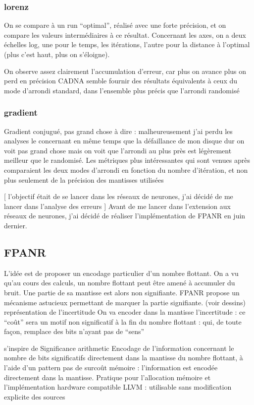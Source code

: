 \documentclass[a4paper,11pt]{article}
\begin{document}
\subsubsection{lorenz}
On se compare à un run “optimal”, réalisé avec une forte précision, et on compare les valeurs intermédiaires à ce résultat.
Concernant les axes, on a deux échelles log, une pour le temps, les itérations, l’autre pour la distance à l’optimal (plus c’est haut, plus on s’éloigne).

On observe assez clairement l’accumulation d’erreur, car plus on avance plus on perd en précision 
CADNA semble fournir des résultats équivalents à ceux du mode d’arrondi standard, dans l’ensemble plus précis que l’arrondi randomisé

\subsubsection{gradient}
Gradient conjugué, pas grand chose à dire : malheureusement j’ai perdu les analyses le concernant en même temps que la défaillance de mon disque dur
on voit pas grand chose mais on voit que l’arrondi au plus près est légèrement meilleur que le randomisé.
Les métriques plus intéressantes qui sont venues après comparaient les deux modes d’arrondi en fonction du nombre d’itération, et non plus seulement de la précision des mantisses utilisées

[ l’objectif était de se lancer dans les réseaux de neurones, j’ai décidé de me lancer dans l’analyse des erreurs ]
Avant de me lancer dans l’extension aux réseaux de neurones, j’ai décidé de réaliser l’implémentation de FPANR en juin dernier.

\subsection{ FPANR }
L’idée est de proposer un encodage particulier d’un nombre flottant.
On a vu qu’au cours des calculs, un nombre flottant peut être amené à accumuler du bruit. Une partie de sa mantisse est alors non signifiante.
FPANR propose un mécanisme astucieux permettant de marquer la partie signifiante. (voir dessins) représentation de l’incertitude
On va encoder dans la mantisse l’incertitude : ce “coût” sera un motif non significatif à la fin du nombre flottant : qui, de toute façon, remplace des bits n’ayant pas de “sens”


s’inspire de Significance arithmetic
Encodage de l’information concernant  le nombre de bits significatifs directement dans la mantisse du nombre flottant, à l’aide d’un pattern
pas de surcoût mémoire : l’information est encodée directement dans la mantisse. Pratique pour l’allocation mémoire et l’implémentation hardware
compatible 
LLVM : utilisable sans modification explicite des sources
\end{document}
